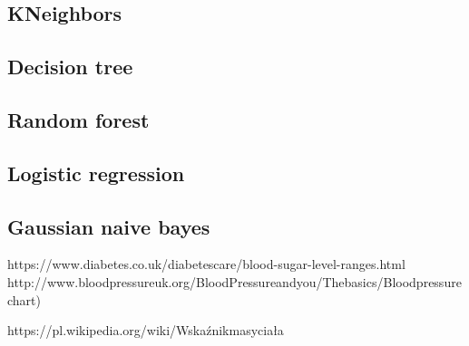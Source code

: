 \documentclass[12pt]{article}
\begin{document}
\subsection{KNeighbors}
\subsection{Decision tree}
\subsection{Random forest}
\subsection{Logistic regression}
\subsection{Gaussian naive bayes}

\begin{thebibliography}{9}

	https://www.diabetes.co.uk/diabetescare/blood-sugar-level-ranges.html
	http://www.bloodpressureuk.org/BloodPressureandyou/Thebasics/Bloodpressurechart)

	https://pl.wikipedia.org/wiki/Wskaźnikmasyciała
\end{thebibliography}
\end{document}
